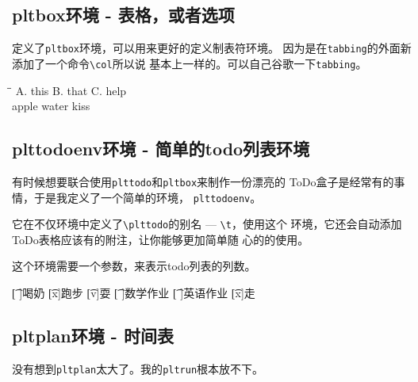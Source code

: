 \documentclass{peterlitsdoc}
\newcommand{\vb}{\verb}
\begin{document}

\subsection{pltbox环境 - 表格，或者选项}

定义了\vb|pltbox|环境，可以用来更好的定义制表符环境。
因为是在\vb|tabbing|的外面新添加了一个命令\vb|\col|所以说
基本上一样的。可以自己谷歌一下\vb|tabbing|。

\begin{pltrun}
\begin{pltbox}
\=\=\kill
A. this   \>B. that   \>C. help   \\
\plttodo[ ]apple                  \>
\plttodo[x]water                  \>
\plttodo[ ]kiss                   \\
\end{pltbox}
\end{pltrun}



\subsection{plttodoenv环境 - 简单的todo列表环境}

有时候想要联合使用\vb|plttodo|和\vb|pltbox|来制作一份漂亮的
ToDo盒子是经常有的事情，于是我定义了一个简单的环境，
\vb|plttodoenv|。

它在不仅环境中定义了\vb|\plttodo|的别名 --- \vb|\t|，使用这个
环境，它还会自动添加ToDo表格应该有的附注，让你能够更加简单随
心的的使用。

这个环境需要一个参数，来表示todo列表的列数。

\begin{pltrun}
\begin{plttodoenv}{2}
\t[ ]喝奶     \t[x]跑步     \t[v]耍
\t[ ]数学作业 \t[ ]英语作业 \t[x]走
\end{plttodoenv}
\end{pltrun}



\subsection{pltplan环境 - 时间表}

没有想到\vb|pltplan|太大了。我的\vb|pltrun|根本放不下。
\end{document}
